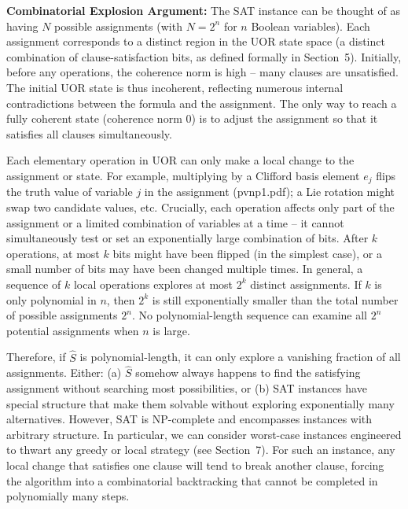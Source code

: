\documentclass{article}
\begin{document}
\medskip
\textbf{Combinatorial Explosion Argument:} The SAT instance can be thought of as having $N$ possible assignments (with $N = 2^n$ for $n$ Boolean variables). Each assignment corresponds to a distinct region in the UOR state space (a distinct combination of clause-satisfaction bits, as defined formally in Section~5). Initially, before any operations, the coherence norm is high – many clauses are unsatisfied. The initial UOR state is thus incoherent, reflecting numerous internal contradictions between the formula and the assignment. The only way to reach a fully coherent state (coherence norm $0$) is to adjust the assignment so that it satisfies all clauses simultaneously.

Each elementary operation in UOR can only make a local change to the assignment or state. For example, multiplying by a Clifford basis element $e_j$ flips the truth value of variable $j$ in the assignment (pvnp1.pdf); a Lie rotation might swap two candidate values, etc. Crucially, each operation affects only part of the assignment or a limited combination of variables at a time – it cannot simultaneously test or set an exponentially large combination of bits. After $k$ operations, at most $k$ bits might have been flipped (in the simplest case), or a small number of bits may have been changed multiple times. In general, a sequence of $k$ local operations explores at most $2^k$ distinct assignments. If $k$ is only polynomial in $n$, then $2^k$ is still exponentially smaller than the total number of possible assignments $2^n$. No polynomial-length sequence can examine all $2^n$ potential assignments when $n$ is large.

Therefore, if $\hat{S}$ is polynomial-length, it can only explore a vanishing fraction of all assignments. Either: (a) $\hat{S}$ somehow always happens to find the satisfying assignment without searching most possibilities, or (b) SAT instances have special structure that make them solvable without exploring exponentially many alternatives. However, SAT is NP-complete and encompasses instances with arbitrary structure. In particular, we can consider worst-case instances engineered to thwart any greedy or local strategy (see Section~7). For such an instance, any local change that satisfies one clause will tend to break another clause, forcing the algorithm into a combinatorial backtracking that cannot be completed in polynomially many steps.
\end{document}

